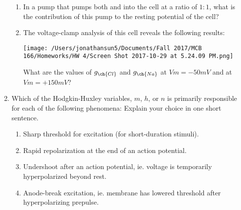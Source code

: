 \documentclass[11pt]{article}
\begin{document}
\begin{enumerate}[label=\arabic*.]
\begin{enumerate}[label=(\alph*)]
\item
In a pump that pumps both  and  into the cell at a ratio of $1 : 1$, what is the contribution of this pump to the resting potential of the cell?






\item
The voltage-clamp analysis of this cell reveals the following results:
\begin{center}
\texttt{[image: /Users/jonathansun5/Documents/Fall 2017/MCB 166/Homeworks/HW 4/Screen Shot 2017-10-29 at 5.24.09 PM.png]}
\end{center}
What are the values of $g_{\ch{Cl}}$ and $g_{\ch{Na}}$ at $Vm = -50 mV$ and at $Vm = +150 mV$?


\end{enumerate}



\newpage
\item
Which of the Hodgkin-Huxley variables, $m$, $h$, or $n$ is primarily responsible for each of the following phenomena: Explain your choice in one short sentence.
\begin{enumerate}[label=(\alph*)]
\item
Sharp threshold for excitation (for short-duration stimuli).



\item
Rapid repolarization at the end of an action potential.



\item
Undershoot after an action potential, ie. voltage is temporarily hyperpolarized beyond rest.



\item
Anode-break excitation, ie. membrane has lowered threshold after hyperpolarizing prepulse.



\end{enumerate}




\end{enumerate}
\end{document}
